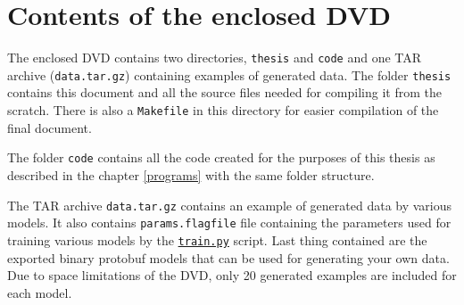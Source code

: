 \chapter{Contents of the enclosed DVD} \label{cd}

The enclosed DVD contains two directories, \texttt{thesis} and \texttt{code} and one TAR archive (\texttt{data.tar.gz}) containing examples of generated data. The folder \texttt{thesis} contains this document and all the source files needed for compiling it from the scratch. There is also a \texttt{Makefile} in this directory for easier compilation of the final document.

The folder \texttt{code} contains all the code created for the purposes of this thesis as described in the chapter \ref{programs} with the same folder structure.

The TAR archive \texttt{data.tar.gz} contains an example of generated data by various models. It also contains \texttt{params.flagfile} file containing the parameters used for training various models by the \hyperref[trainpy]{\texttt{train.py}} script. Last thing contained are the exported binary protobuf models that can be used for generating your own data. Due to space limitations of the DVD, only 20 generated examples are included for each model.
